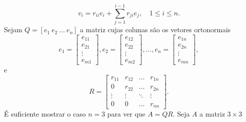 \documentclass{article}
\begin{document}
    \[
        v_i = r_{ii} e_i + \sum_{j=1}^{i-1} r_{ji} e_j, \quad 1 \leq i \leq n.
    \]
Sejam \(Q = [e_1 \ e_2 \ \ldots \ e_n]\) a matriz cujas colunas são os vetores ortonormais
    \[
        e_1 = \begin{bmatrix}
            e_{11} \\
            e_{21} \\
            \vdots \\
            e_{m1}
        \end{bmatrix},
        e_2 = \begin{bmatrix}
            e_{12} \\
            e_{22} \\
            \vdots \\
            e_{m2}
        \end{bmatrix},
        \ldots,
        e_n = \begin{bmatrix}
            e_{1n} \\
            e_{2n} \\
            \vdots \\
            e_{mn}
        \end{bmatrix},
    \]
e
    \[
        R = \begin{bmatrix}
            r_{11} & r_{12} & \ldots & r_{1n} \\
            0 & r_{22} & \ldots & r_{2n} \\
            \vdots & \vdots & \ddots & \vdots \\
            0 & 0 & \ldots & r_{nn}
        \end{bmatrix}.
    \]
É suficiente mostrar o caso \(n=3\) para ver que \(A=QR\). Seja \(A\) a matriz \(3 \times 3\)
\end{document}
